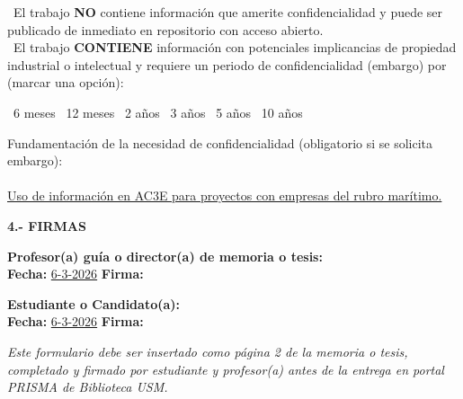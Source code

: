 \vspace{0.1cm}
{\small 
\noindent \checkbox\ El trabajo \textbf{NO} contiene información que amerite confidencialidad y puede ser publicado de inmediato en repositorio con acceso abierto.\\
\checkedbox\  El trabajo \textbf{CONTIENE} información con potenciales implicancias de propiedad industrial o intelectual y requiere un periodo de confidencialidad (embargo) por (marcar una opción):

\vspace{0.2cm}
\checkbox\ 6 meses \hspace{0.5cm}
\checkedbox\ 12 meses \hspace{0.5cm}
\checkbox\ 2 años \hspace{0.5cm}
\checkbox\ 3 años \hspace{0.5cm}
\checkbox\ 5 años \hspace{0.5cm}
\checkbox\ 10 años

\vspace{0.2cm}

\noindent Fundamentación de la necesidad de confidencialidad (obligatorio si se solicita embargo):\\
\\
\hspace{4.5cm} \underline{Uso de información en AC3E para proyectos con empresas del rubro marítimo.}\\
}

 \noindent \textbf{\small 4.- FIRMAS}

\vspace{0.1cm}
{\small
\noindent \textbf{Profesor(a) guía o director(a) de memoria o tesis:}\\[0.2cm] 
\indent \hspace{4.5cm} \textbf{Fecha:} \underline{6-3-2026} \hspace{2cm} \textbf{Firma:} %

\vspace{2.5cm}

\noindent \textbf{Estudiante o Candidato(a):}\\[0.2cm]
\indent \hspace{4.5cm} \textbf{Fecha:} \underline{6-3-2026} \hspace{2cm} \textbf{Firma:} 
}


\vspace{1cm}

\noindent \textit{\small Este formulario debe ser insertado como página 2 de la memoria o tesis, completado y firmado por estudiante y profesor(a) antes de la entrega en portal PRISMA de Biblioteca USM.}\\%
